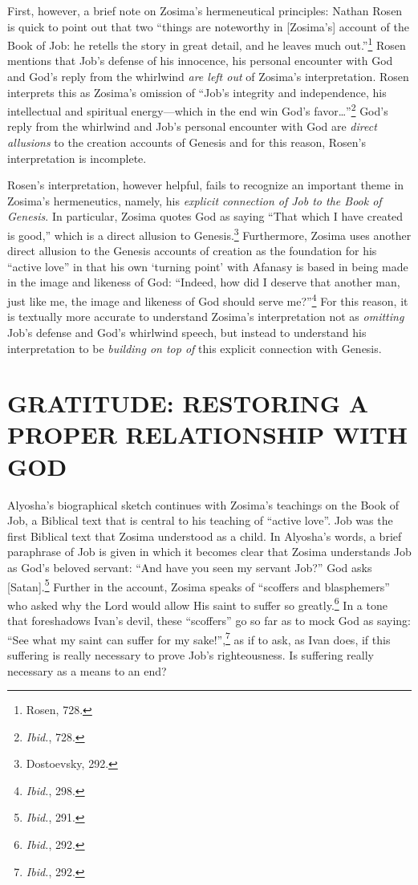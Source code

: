 First, however, a brief note on Zosima's hermeneutical principles: Nathan Rosen is quick to point out that two ``things are noteworthy in [Zosima's] account of the Book of Job: he retells the story in great detail, and he leaves much out.''\footnote{Rosen, 728.} Rosen mentions that Job's defense of his innocence, his personal encounter with God and God's reply from the whirlwind \emph{are left out} of Zosima's interpretation. Rosen interprets this as Zosima's omission of ``Job's integrity and independence, his intellectual and spiritual energy---which in the end win God's favor\ldots''\footnote{\emph{Ibid.}, 728.} God's reply from the whirlwind and Job's personal encounter with God are \emph{direct allusions} to the creation accounts of Genesis and for this reason, Rosen's interpretation is incomplete.

Rosen's interpretation, however helpful, fails to recognize an important theme in Zosima's hermeneutics, namely, his \emph{explicit connection of Job to the Book of Genesis}. In particular, Zosima quotes God as saying ``That which I have created is good,'' which is a direct allusion to Genesis.\footnote{Dostoevsky, 292.} Furthermore, Zosima uses another direct allusion to the Genesis accounts of creation as the foundation for his ``active love'' in that his own `turning point' with Afanasy is based in being made in the image and likeness of God: ``Indeed, how did I deserve that another man, just like me, the image and likeness of God should serve me?''\footnote{\emph{Ibid.}, 298.} For this reason, it is textually more accurate to understand Zosima's interpretation not as \emph{omitting} Job's defense and God's whirlwind speech, but instead to understand his interpretation to be \emph{building on top of} this explicit connection with Genesis.

\chapter{GRATITUDE: RESTORING A PROPER RELATIONSHIP WITH GOD}
Alyosha's biographical sketch continues with Zosima's teachings on the Book of Job, a Biblical text that is central to his teaching of ``active love''. Job was the first Biblical text that Zosima understood as a child. In Alyosha's words, a brief paraphrase of Job is given in which it becomes clear that Zosima understands Job as God's beloved servant: ``And have you seen my servant Job?'' God asks [Satan].\footnote{\emph{Ibid.}, 291.} Further in the account, Zosima speaks of ``scoffers and blasphemers'' who asked why the Lord would allow His saint to suffer so greatly.\footnote{\emph{Ibid.}, 292.} In a tone that foreshadows Ivan's devil, these ``scoffers'' go so far as to mock God as saying: ``See what my saint can suffer for my sake!'',\footnote{\emph{Ibid.}, 292.} as if to ask, as Ivan does, if this suffering is really necessary to prove Job's righteousness. Is suffering really necessary as a means to an end?

